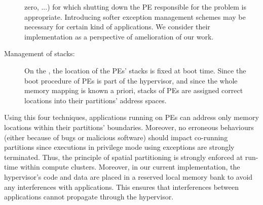 \documentclass[main.tex]{subfiles}
\begin{document}
\begin{description}
        zero, ...) for which shutting down the PE responsible for the problem
        is appropriate. Introducing softer exception management schemes may be
        necessary for certain kind of applications. We consider their
        implementation as a perspective of amelioration of our work.
    \item[Management of stacks: ] On the \mppalong, the location of the PEs'
        stacks is fixed at boot time. Since the boot procedure of PEs is part
        of the hypervisor, and since the whole memory mapping is known a
        priori, stacks of PEs are assigned correct locations into their
        partitions' address spaces.
\end{description}

Using this four techniques, applications running on PEs can address only memory
locations within their partitions' boundaries. Moreover, no erroneous
behaviours (either because of bugs or malicious software) should impact
co-running partitions since executions in privilege mode using exceptions are
strongly terminated. Thus, the principle of spatial partitioning is strongly
enforced at run-time within compute clusters. Moreover, in our current
implementation, the hypervisor's code and data are placed in a reserved local
memory bank to avoid any interferences with applications. This ensures that
interferences between applications cannot propagate through the hypervisor. 
\end{document}
